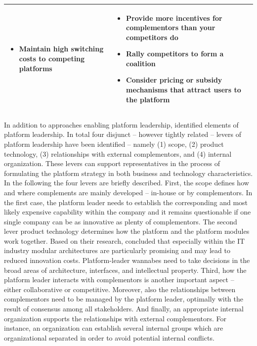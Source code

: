 \begin{table}[t]
\begin{tabular}{L{.45\textwidth}L{.45\textwidth}}
\begin{itemize}[leftmargin=*, parsep=0pt, topsep=0pt, itemsep=0pt]
				\item Maintain high switching costs to competing platforms	\vspace{-\baselineskip} 
			\end{itemize} &
			\vspace{-4mm}
			\footnotesize
			\begin{itemize}[leftmargin=*, parsep=0pt, topsep=0pt, itemsep=0pt]
				\item Provide more incentives for complementors than your competitors do
				\item Rally competitors to form a coalition
				\item Consider pricing or subsidy mechanisms that attract users to the platform \vspace{-\baselineskip} 
			\end{itemize} \\ \bottomrule
	\end{tabular}
\end{table}

In addition to approaches enabling platform leadership, \citet{Cusumano2002} identified elements of platform leadership. In total four disjunct -- however tightly related -- levers of platform leadership have been identified -- namely (1) scope, (2) product technology, (3) relationships with external complementors, and (4) internal organization. These levers can support representatives in the process of formulating the platform strategy in both business and technology characteristics. In the following the four levers are briefly described. First, the scope defines how and where complements are mainly developed -- in-house or by complementors. In the first case, the platform leader needs to establish the corresponding and most likely expensive capability within the company and it remains questionable if one single company can be as innovative as plenty of complementors. The second lever product technology determines how the platform and the platform modules work together. Based on their research, \citet[pp. 55-56]{Cusumano2002} concluded that especially within the \ac{IT} industry modular architectures are particularly promising and may lead to reduced innovation costs. Platform-leader wannabes need to take decisions in the broad areas of architecture, interfaces, and intellectual property. Third, how the platform leader interacts with complementors is another important aspect -- either collaborative or competitive. Moreover, also the relationships between complementors need to be managed by the platform leader, optimally with the result of consensus among all stakeholders. And finally, an appropriate internal organization supports the relationships with external complementors. For instance, an organization can establish several internal groups which are organizational separated in order to avoid potential internal conflicts.

